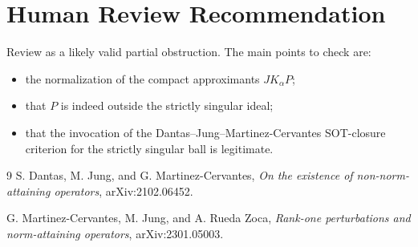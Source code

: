 \documentclass[11pt]{amsart}
\begin{document}
\section{Human Review Recommendation}

Review as a likely valid partial obstruction.  The main points to check are:

\begin{itemize}
\item the normalization of the compact approximants \(J K_\alpha P\);
\item that \(P\) is indeed outside the strictly singular ideal;
\item that the invocation of the Dantas--Jung--Martinez-Cervantes
SOT-closure criterion for the strictly singular ball is legitimate.
\end{itemize}

\begin{thebibliography}{9}
S. Dantas, M. Jung, and G. Martinez-Cervantes,
\emph{On the existence of non-norm-attaining operators},
arXiv:2102.06452.

G. Martinez-Cervantes, M. Jung, and A. Rueda Zoca,
\emph{Rank-one perturbations and norm-attaining operators},
arXiv:2301.05003.
\end{thebibliography}
\end{document}
